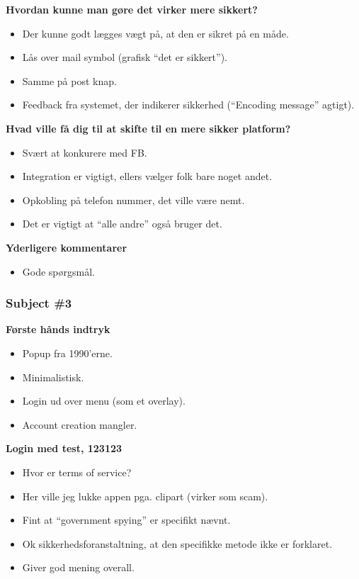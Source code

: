 \noindent\textbf{Hvordan kunne man gøre det virker mere sikkert?}
\begin{itemize}
    \item Der kunne godt lægges vægt på, at den er sikret på en måde.
    \item Lås over mail symbol (grafisk “det er sikkert”).
    \item Samme på post knap.
    \item Feedback fra systemet, der indikerer sikkerhed (“Encoding message” agtigt).
\end{itemize}

\noindent\textbf{Hvad ville få dig til at skifte til en mere sikker platform?}
\begin{itemize}
    \item Svært at konkurere med FB.
    \item Integration er vigtigt, ellers vælger folk bare noget andet.
    \item Opkobling på telefon nummer, det ville være nemt.
    \item Det er vigtigt at “alle andre” også bruger det.
\end{itemize}

\noindent\textbf{Yderligere kommentarer}
\begin{itemize}
    \item Gode spørgsmål.
\end{itemize}

\subsubsection{Subject \#3}

\noindent\textbf{Første hånds indtryk}
\begin{itemize}
    \item Popup fra 1990’erne.
    \item Minimalistisk.
    \item Login ud over menu (som et overlay).
    \item Account creation mangler.
\end{itemize}

\noindent\textbf{Login med test, 123123}
\begin{itemize}
    \item Hvor er terms of service?
    \item Her ville jeg lukke appen pga. clipart (virker som scam).
    \item Fint at “government spying” er specifikt nævnt.
    \item Ok sikkerhedsforanstaltning, at den specifikke metode ikke er forklaret.
    \item Giver god mening overall.
\end{itemize}

